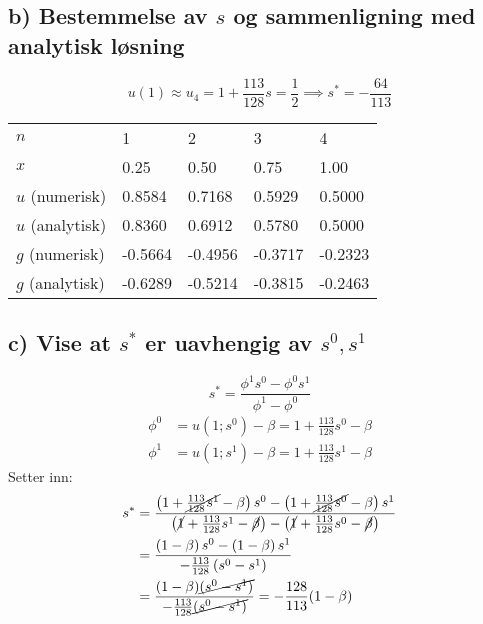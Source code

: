 \pagebreak
\subsection*{b) Bestemmelse av $s$ og sammenligning med analytisk løsning} %
\label{sub:b_bestemmelse_av_}

\begin{equation}
  u(1) \approx u_4 = 1 + \frac{113}{128}s = \frac{1}{2} \implies s^* = -\frac{64}{113}
\end{equation}

\begin{table}[H]
\centering
\begin{tabularx}{1.0\textwidth}{X|XXXX}
\toprule
$n$             & 1       & 2       & 3       & 4    \\
$x$             & 0.25    & 0.50    & 0.75    & 1.00 \\
\midrule
$u$ (numerisk)  & 0.8584  & 0.7168  & 0.5929  & 0.5000  \\
$u$ (analytisk) & 0.8360  & 0.6912  & 0.5780  & 0.5000  \\
$g$ (numerisk)  & -0.5664 & -0.4956 & -0.3717 & -0.2323 \\
$g$ (analytisk) & -0.6289 & -0.5214 & -0.3815 & -0.2463 \\
\bottomrule
\end{tabularx}
\end{table}



\clearpage
\subsection*{c) Vise at $s^*$ er uavhengig av $s^0, s^1$} %
\label{sub:c_vise_at_}
\begin{equation}
  s^* = \frac{\phi^1 s^0 - \phi^0 s^1}{\phi^1 - \phi^0}
\end{equation}
\begin{align}
  \phi^0 & = u(1;s^0) - \beta = 1 + \frac{113}{128}s^0 - \beta \\
  \phi^1 & = u(1;s^1) - \beta = 1 + \frac{113}{128}s^1 - \beta
\end{align}
Setter inn:
\begin{align}
  s^* &=\frac{ \left( 1 + \cancel{\frac{113}{128}s^1} - \beta \right) s^0
             - \left( 1 + \cancel{\frac{113}{128}s^0} - \beta \right) s^1}
             { \left( \cancel{1} + \frac{113}{128}s^1 - \cancel{\beta} \right)
             - \left( \cancel{1} + \frac{113}{128}s^0 - \cancel{\beta} \right) } \\
      &=\frac{ \left( 1 - \beta \right) s^0
             - \left( 1 - \beta \right) s^1}
             {  - \frac{113}{128} \left( s^0 - s^1 \right) } \\
      &=\frac{(1-\beta)\cancel{(s^0-s^1)}}{- \frac{113}{128} \cancel{(s^0-s^1)}}
       = - \frac{128}{113}(1-\beta)
\end{align}


